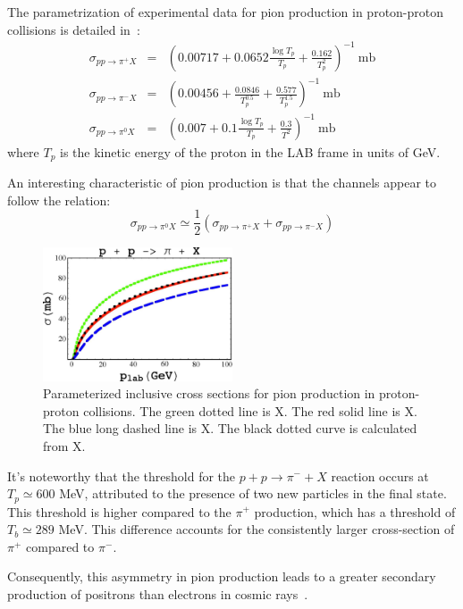 The parametrization of experimental data for pion production in proton-proton collisions is detailed in~\cite{Norbury2009nimpb}:
%
\begin{eqnarray*}
\sigma_{pp\rightarrow \pi^+ X} & = & \left( 0.00717 + 0.0652 \frac{\log T_p}{T_p} + \frac{0.162}{T_p^2} \right)^{-1}~\text{mb} \\
\sigma_{pp\rightarrow \pi^- X} & = & \left( 0.00456 + \frac{0.0846}{T_p^{0.5}} + \frac{0.577}{T_p^{1.5}} \right)^{-1}~\text{mb} \\
\sigma_{pp\rightarrow \pi^0 X} & = & \left( 0.007 + 0.1 \frac{\log T_p}{T_p} + \frac{0.3}{T^2} \right)^{-1}~\text{mb} 
\end{eqnarray*}
%
where $T_p$ is the kinetic energy of the proton in the LAB frame in units of GeV.

An interesting characteristic of pion production is that the channels appear to follow the relation:
%
\[ 
\sigma_{pp\rightarrow \pi^0 X}  \simeq \frac{1}{2} (\sigma_{pp\rightarrow \pi^+ X}  + \sigma_{pp\rightarrow \pi^- X}) 
\]

\begin{figure}[t]
\centering
\includegraphics[width=0.5\textwidth]{figures/Norbury2009.jpg}
\caption{Parameterized inclusive cross sections for pion production in proton-proton collisions. The green dotted line is X. The red solid line is X. The blue long dashed line is X. The black dotted curve is calculated from X. ~\cite{Norbury2009nimpb}}
\end{figure}

It's noteworthy that the threshold for the \( p+p \rightarrow \pi^- + X \) reaction occurs at \( T_p \simeq 600 \) MeV, attributed to the presence of two new particles in the final state. This threshold is higher compared to the \( \pi^+ \) production, which has a threshold of \( T_b \simeq 289 \) MeV. This difference accounts for the consistently larger cross-section of \( \pi^+ \) compared to \( \pi^- \).

Consequently, this asymmetry in pion production leads to a greater secondary production of positrons than electrons in cosmic rays~\cite{Moskalenko1998apj}.

